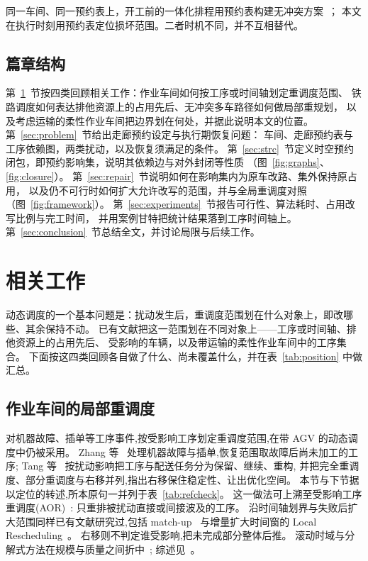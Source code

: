 \documentclass[manuscript,screen,review]{acmart}
\begin{document}
同一车间、同一预约表上，开工前的一体化排程用预约表构建无冲突方案~\cite{vanos2026exact,li2026framework,sun2023integrated}；
本文在执行时刻用预约表定位损坏范围。二者时机不同，并不互相替代。

\subsection{篇章结构}

第~\ref{sec:related_work}~节按四类回顾相关工作：作业车间如何按工序或时间轴划定重调度范围、
铁路调度如何表达排他资源上的占用先后、无冲突多车路径如何做局部重规划，
以及考虑运输的柔性作业车间把边界划在何处，并据此说明本文的位置。
第~\ref{sec:problem}~节给出走廊预约设定与执行期恢复问题：
车间、走廊预约表与工序依赖图，两类扰动，以及恢复须满足的条件。
第~\ref{sec:strc}~节定义时空预约闭包，即预约影响集，说明其依赖边与对外封闭等性质
（图~\ref{fig:graphs}、\ref{fig:closure}）。
第~\ref{sec:repair}~节说明如何在影响集内为原车改路、集外保持原占用，
以及仍不可行时如何扩大允许改写的范围，并与全局重调度对照（图~\ref{fig:framework}）。
第~\ref{sec:experiments}~节报告可行性、算法耗时、占用改写比例与完工时间，
并用案例甘特把统计结果落到工序时间轴上。
第~\ref{sec:conclusion}~节总结全文，并讨论局限与后续工作。

\section{相关工作}
\label{sec:related_work}


动态调度的一个基本问题是：扰动发生后，重调度范围划在什么对象上，即改哪些、其余保持不动。
已有文献把这一范围划在不同对象上——工序或时间轴、排他资源上的占用先后、
受影响的车辆，以及带运输的柔性作业车间中的工序集合。
下面按这四类回顾各自做了什么、尚未覆盖什么，并在表~\ref{tab:position} 中做汇总。

\subsection{作业车间的局部重调度}
\label{sec:rw_aor}

对机器故障、插单等工序事件,按受影响工序划定重调度范围,在带 AGV 的动态调度中仍被采用。
Zhang 等~\cite{zhang2023energy} 处理机器故障与插单,恢复范围取故障后尚未加工的工序;
Tang 等~\cite{tang2026dynamic} 按扰动影响把工序与配送任务分为保留、继续、重构,
并把完全重调度、部分重调度与右移并列,指出右移保住稳定性、让出优化空间。
本节与下节据以定位的转述,所本原句一并列于表~\ref{tab:refcheck}。
这一做法可上溯至受影响工序重调度(AOR)~\cite{abumaizar1997rescheduling,subramaniam2003maor}:
只重排被扰动直接或间接波及的工序。
沿时间轴划界与失败后扩大范围同样已有文献研究过,包括 match-up~\cite{akturk1999matchup}
与增量扩大时间窗的 Local Rescheduling~\cite{kuster2007local}。
右移则不判定谁受影响,把未完成部分整体后推。
滚动时域与分解式方法在规模与质量之间折中~\cite{zeitrag2025novel,zhao2019decomposition};
综述见~\cite{vieira2003rescheduling,ouelhadj2009survey}。
\end{document}
